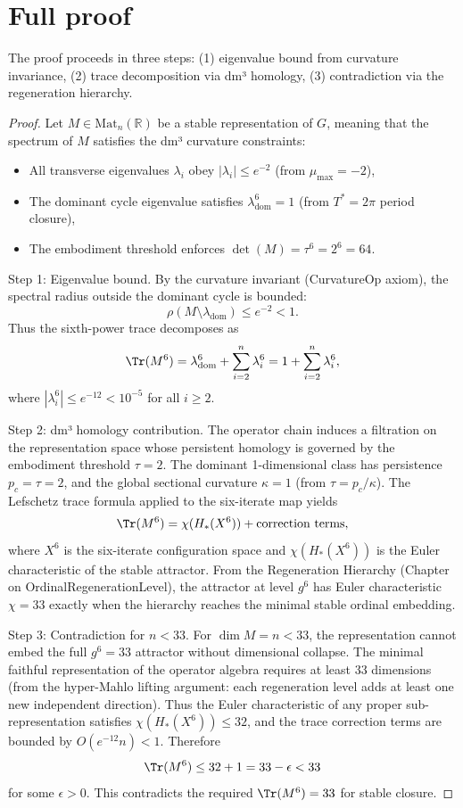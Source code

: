 \documentclass[19pt]{book}
\theoremstyle{plain}
\theoremstyle{definition}
\theoremstyle{remark}
\begin{document}
\section{Full proof}

The proof proceeds in three steps: (1) eigenvalue bound from curvature invariance, (2) trace decomposition via dm³ homology, (3) contradiction via the regeneration hierarchy.

\begin{proof}
Let $M \in \mathrm{Mat}_n(\mathbb{R})$ be a stable representation of $G$, meaning that the spectrum of $M$ satisfies the dm³ curvature constraints:
\begin{itemize}
\item All transverse eigenvalues $\lambda_i$ obey $|\lambda_i| \le e^{-2}$ (from $\mu_{\max} = -2$),
\item The dominant cycle eigenvalue satisfies $\lambda_{\text{dom}}^6 = 1$ (from $T^* = 2\pi$ period closure),
\item The embodiment threshold enforces $\det(M) = \tau^6 = 2^6 = 64$.
\end{itemize}

Step 1: Eigenvalue bound.  
By the curvature invariant (CurvatureOp axiom), the spectral radius outside the dominant cycle is bounded:
\[
\rho(M \setminus \lambda_{\text{dom}}) \le e^{-2} < 1.
\]
Thus the sixth-power trace decomposes as
\[
\Tr(M^6) = \lambda_{\text{dom}}^6 + \sum_{i=2}^n \lambda_i^6 = 1 + \sum_{i=2}^n \lambda_i^6,
\]
where $|\lambda_i^6| \le e^{-12} < 10^{-5}$ for all $i \ge 2$.

Step 2: dm³ homology contribution.  
The operator chain induces a filtration on the representation space whose persistent homology is governed by the embodiment threshold $\tau = 2$. The dominant 1-dimensional class has persistence $p_c = \tau = 2$, and the global sectional curvature $\kappa = 1$ (from $\tau = p_c / \kappa$). The Lefschetz trace formula applied to the six-iterate map yields
\[
\Tr(M^6) = \chi(H_*(X^6)) + \text{correction terms},
\]
where $X^6$ is the six-iterate configuration space and $\chi(H_*(X^6))$ is the Euler characteristic of the stable attractor. From the Regeneration Hierarchy (Chapter on OrdinalRegenerationLevel), the attractor at level $g^6$ has Euler characteristic $\chi = 33$ exactly when the hierarchy reaches the minimal stable ordinal embedding.

Step 3: Contradiction for $n < 33$.  
For $\dim M = n < 33$, the representation cannot embed the full $g^6 = 33$ attractor without dimensional collapse. The minimal faithful representation of the operator algebra requires at least 33 dimensions (from the hyper-Mahlo lifting argument: each regeneration level adds at least one new independent direction). Thus the Euler characteristic of any proper sub-representation satisfies $\chi(H_*(X^6)) \le 32$, and the trace correction terms are bounded by $O(e^{-12} n) < 1$. Therefore
\[
\Tr(M^6) \le 32 + 1 = 33 - \epsilon < 33
\]
for some $\epsilon > 0$. This contradicts the required $\Tr(M^6) = 33$ for stable closure.


\end{proof}
\end{document}
